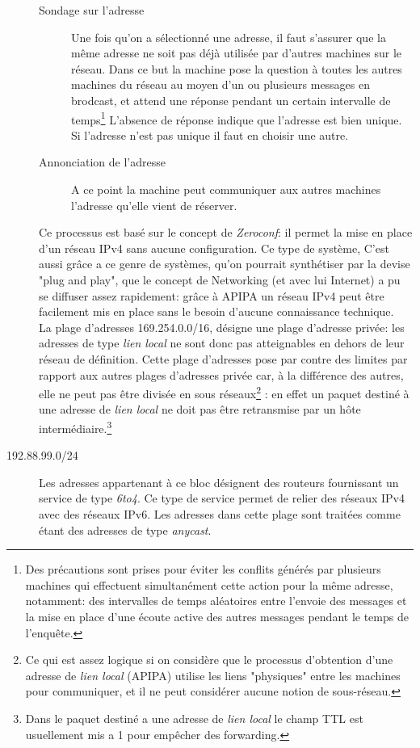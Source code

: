 \begin{description}
\begin{description}
\item[Sondage sur l'adresse]
Une fois qu'on a sélectionné une adresse, il faut s'assurer que la même adresse ne soit
pas déjà utilisée par d'autres machines sur le réseau. Dans ce but la machine
pose la question à toutes les autres machines du réseau au moyen d'un ou plusieurs messages
en brodcast, et attend une réponse pendant un certain intervalle de temps\footnote{
Des précautions sont prises pour éviter les conflits générés par plusieurs
machines qui effectuent simultanément cette action pour la même adresse,
notamment: des intervalles de temps aléatoires entre l'envoie des messages et la mise
en place d'une écoute active des autres messages pendant le temps de l'enquête.}
L'absence de réponse indique que l'adresse est bien unique. Si l'adresse n'est
pas unique il faut en choisir une autre.

\item[Annonciation de l'adresse]
A ce point la machine peut communiquer aux autres machines l'adresse qu'elle
vient de réserver.

\end{description}



Ce processus est basé sur le concept de {\it Zeroconf}: il permet la mise en
place d'un réseau IPv4 sans aucune configuration. Ce type de système,
C'est aussi grâce a ce genre de systèmes, qu'on 
pourrait synthétiser par la devise %
"plug and play", que le concept de Networking (et avec lui Internet) a pu se
diffuser assez rapidement: grâce à APIPA un réseau IPv4 peut être facilement
mis en place sans le besoin d'aucune connaissance technique.\\

La plage d'adresses 169.254.0.0/16, désigne une plage d'adresse privée: les
adresses de type {\it lien local} ne sont donc pas atteignables en dehors de
leur réseau de définition. 
Cette plage d'adresses pose par contre des limites par rapport aux autres
plages d'adresses privée car, à la différence des autres, elle ne peut pas être
divisée en sous réseaux\footnote{Ce qui est assez logique si on considère que
le processus d'obtention d'une adresse de {\it lien local} (APIPA) utilise
les liens "physiques" entre les machines pour communiquer, et il ne peut
 considérer aucune notion de sous-réseau.}
: en effet un paquet destiné à une adresse de {\it lien local} ne doit pas être
retransmise par un hôte intermédiaire.\footnote{Dans le paquet destiné
a une adresse de {\it lien local} le champ TTL est usuellement mis a 1
pour empêcher des forwarding.}

\item[192.88.99.0/24]
Les adresses appartenant à ce bloc désignent des routeurs 
fournissant un service de type {\it 6to4}. Ce type de service
permet de relier des réseaux IPv4 avec des réseaux IPv6.
Les adresses dans cette plage sont traitées comme étant des adresses
de type {\it anycast}.


\end{description}


